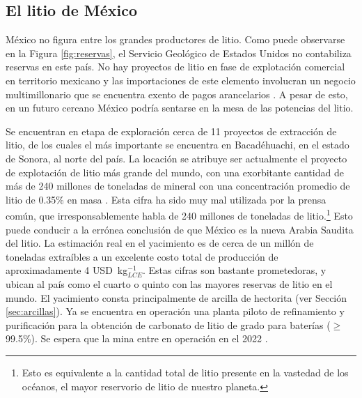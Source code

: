 \subsection{El litio de México}
México no figura entre los grandes productores de litio. Como puede observarse en la Figura \ref{fig:reservas}, el Servicio Geológico de Estados Unidos no contabiliza reservas en este país. %
No hay proyectos de litio en fase de explotación comercial en territorio mexicano y las importaciones de este elemento involucran un negocio multimillonario que se encuentra exento de pagos arancelarios \citep{SecEc2018}. A pesar de esto, en un futuro cercano México podría sentarse en la mesa de las potencias del litio.

Se encuentran en etapa de exploración cerca de 11 proyectos de extracción de litio, de los cuales el más importante se encuentra en Bacadéhuachi, en el estado de Sonora, al norte del país. La locación se atribuye ser actualmente el proyecto de explotación de litio más grande del mundo, con una exorbitante cantidad de más de 240 millones de toneladas de mineral con una concentración promedio de litio de 0.35\% en masa \citep{Bacanora2018}. Esta cifra ha sido muy mal utilizada por la prensa común, que irresponsablemente habla de {240 millones de toneladas de litio}.\footnote{Esto es equivalente a la cantidad total de litio presente en la vastedad de los océanos, el mayor reservorio de litio de nuestro planeta.} Esto puede conducir a la errónea conclusión de que México es la nueva Arabia Saudita del litio. La estimación real en el yacimiento es de cerca de un millón de toneladas extraíbles a un excelente costo total de producción de aproximadamente 4 \ac{USD}~kg$_{LCE}^{-1}$. Estas cifras son bastante prometedoras, y ubican al país como el cuarto o quinto con las mayores reservas de litio en el mundo. El yacimiento consta principalmente de arcilla de hectorita (ver Sección \ref{sec:arcillas}). Ya se encuentra en operación una planta piloto de refinamiento y purificación para la obtención de carbonato de litio de grado para baterías ($\geqslant$99.5\%). Se espera que la mina entre en operación en el 2022 \citep{Bacanora2018}.

